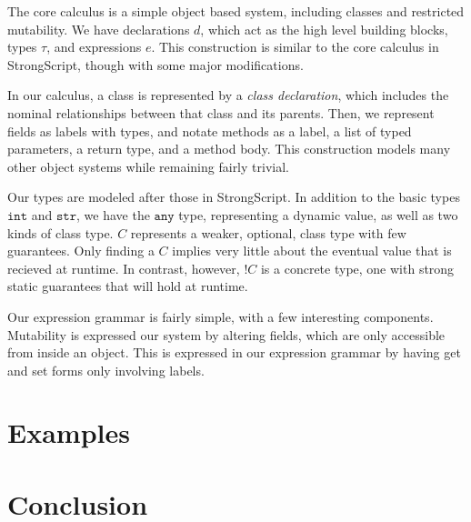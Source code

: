\documentclass{llncs}
\newcommand{\strt}{\texttt{str}}
\newcommand{\intt}{\texttt{int}}
\newcommand{\anyt}{\texttt{any}}
\begin{document}
The core calculus is a simple object based system, including classes and 
restricted mutability. We have declarations $d$, which act as the high level 
building blocks, types $\tau$, and expressions $e$. This construction is 
similar to the core calculus in StrongScript, though with some major 
modifications.

In our calculus, a class is represented by a \emph{class declaration}, which 
includes the nominal relationships between that class and its parents. Then, we 
represent fields as labels with types, and notate methods as a label, a list 
of typed parameters, a return type, and a method body. This construction models 
many other object systems while remaining fairly trivial.

Our types are modeled after those in StrongScript. In addition to the basic 
types $\intt$ and $\strt$, we have the $\anyt$ type, representing a dynamic 
value, as well as two kinds of class type. $C$ represents a weaker, optional, 
class type with few guarantees. Only finding a $C$ implies very little about 
the eventual value that is recieved at runtime. In contrast, however, $!C$ is 
a concrete type, one with strong static guarantees that will hold at runtime. 

Our expression grammar is fairly simple, with a few interesting components. 
Mutability is expressed our system by altering fields, which are only 
accessible from inside an object. This is expressed in our expression
grammar by having get and set forms only involving labels. 

\section{Examples}



\section{Conclusion}




\end{document}
